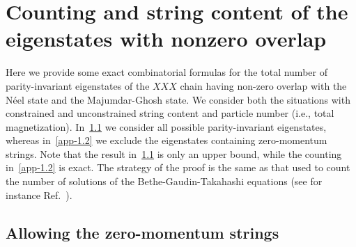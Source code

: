 \documentclass[11pt]{iopart}
\begin{document}
\appendix

\section{Counting and string content of the eigenstates with nonzero overlap}
\label{app-1}

Here we provide some exact combinatorial formulas for the total number of 
parity-invariant eigenstates of the $XXX$ chain having non-zero overlap with 
the N\'eel state and the Majumdar-Ghosh state. We consider both the situations  
with constrained and unconstrained string content and particle number (i.e., 
total magnetization). In~\ref{app-1.1} we consider all possible parity-invariant 
eigenstates, whereas in~\ref{app-1.2} we exclude the eigenstates containing 
zero-momentum strings. Note that the result in~\ref{app-1.1} is only an upper 
bound, while the counting in~\ref{app-1.2} is exact. The strategy of the proof 
is the same as that used to count the number of solutions of the 
Bethe-Gaudin-Takahashi equations (see for instance Ref.~\cite{faddeev-1996}). 

\subsection{Allowing the zero-momentum strings}
\label{app-1.1}
\end{document}
